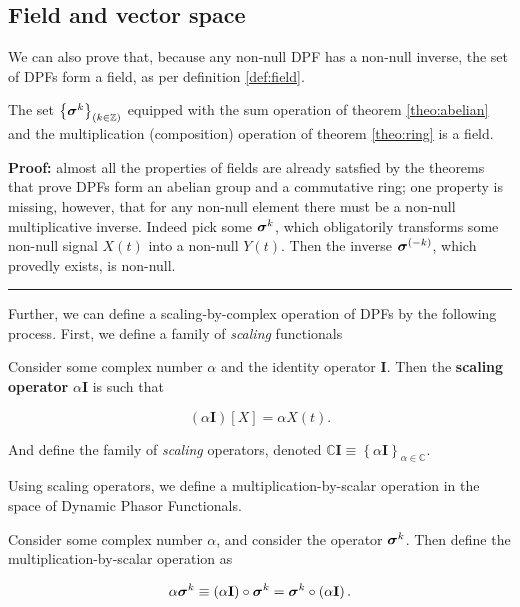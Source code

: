 \subsection{Field and vector space}

	We can also prove that, because any non-null DPF has a non-null inverse, the set of DPFs form a field, as per definition \ref{def:field}.

\begin{theorem}\label{theo:dpfs_field}%
	The set $\left\{\boldsymbol{\sigma}^{k}\right\}_{(k\in\mathbb{Z})}$ equipped with the sum operation of theorem \ref{theo:abelian} and the multiplication (composition) operation of theorem \ref{theo:ring} is a field.
\end{theorem}
\textbf{Proof:} almost all the properties of fields are already satsfied by the theorems that prove DPFs form an abelian group and a commutative ring; one property is missing, however, that for any non-null element there must be a non-null multiplicative inverse. Indeed pick some $\boldsymbol{\sigma}^{k}$, which obligatorily transforms some non-null signal $X(t)$ into a non-null $Y(t)$. Then the inverse $\boldsymbol{\sigma}^{(-k)}$, which provedly exists, is non-null.
\vspace{5mm}
\hrule
\vspace{5mm}%

	Further, we can define a scaling-by-complex operation of DPFs by the following process. First, we define a family of \textit{scaling} functionals

\begin{definition}\label{def:scaling_dpfs} %
	Consider some complex number $\alpha$ and the identity operator $\mathbf{I}$. Then the \textbf{scaling operator} $\alpha\mathbf{I}$ is such that

\begin{equation} \left(\alpha \mathbf{I}\right)\left[X\right] = \alpha X(t).\end{equation}

	And define the family of \textit{scaling} operators, denoted $\mathbb{C}\mathbf{I}\equiv \left\{\alpha \mathbf{I}\right\}_{\alpha\in\mathbb{C}}$. 
\end{definition} %

	Using scaling operators, we define a multiplication-by-scalar operation in the space of Dynamic Phasor Functionals.

\begin{definition}\label{def:scaling_dpfs_all} %
	Consider some complex number $\alpha$, and consider the operator $\boldsymbol{\sigma}^{k}$. Then define the multiplication-by-scalar operation as 

\begin{equation} \alpha \boldsymbol{\sigma}^{k} \equiv \left(\alpha\mathbf{I}\right)\circ\boldsymbol{\sigma}^{k} = \boldsymbol{\sigma}^{k}\circ\left(\alpha\mathbf{I}\right) .\end{equation}
\end{definition} %

